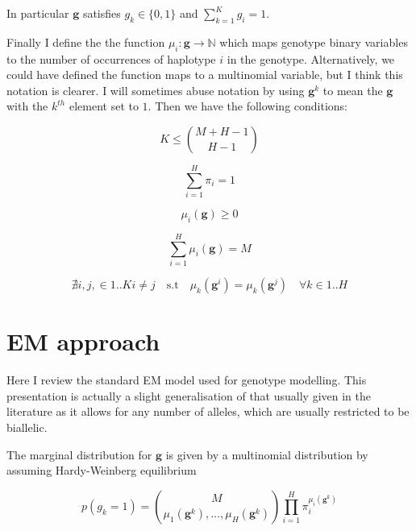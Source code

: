 \documentclass{article}
\begin{document}
In particular $\boldsymbol{g}$ satisfies $g_k \in \{0, 1\}$ and $\sum_{k = 1}^{K} g_i = 1$.

Finally I define the the function $\mu_i : \boldsymbol{g} \rightarrow \mathbb{N}$ which maps genotype binary variables to the number of occurrences of haplotype $i$ in the genotype. Alternatively, we could have defined the function maps to a multinomial variable, but I think this notation is clearer. I will sometimes abuse notation by using $\boldsymbol{g}^k$ to mean the $\boldsymbol{g}$ with the $k^{th}$ element set to $1$. Then we have the following conditions:

\begin{equation} 
    K \le \binom{M + H - 1}{H - 1}
\end{equation}

\begin{equation} 
    \sum_{i = 1}^{H} \pi_i = 1
\end{equation}

\begin{equation} 
    \mu_i(\boldsymbol{g}) \ge 0
\end{equation}

\begin{equation} 
    \sum_{i = 1}^{H} \mu_i(\boldsymbol{g}) = M
\end{equation}

\begin{equation} 
    \nexists i,j,\in {1..K} i \ne j \quad \text{s.t} \quad \mu_k(\boldsymbol{g}^i) = \mu_k(\boldsymbol{g}^j) \quad \forall k \in {1..H}
\end{equation}

\section{EM approach}

Here I review the standard EM model used for genotype modelling. This presentation is actually a slight generalisation of that usually given in the literature as it allows for any number of alleles, which are usually restricted to be biallelic.

The marginal distribution for $\boldsymbol{g}$ is given by a multinomial distribution by assuming Hardy-Weinberg equilibrium

\begin{equation} 
    p(g_k = 1) = \binom{M}{\mu_1(\boldsymbol{g}^k),\dots,\mu_H(\boldsymbol{g}^k)} \prod_{i = 1}^H \pi_i^{\mu_i(\boldsymbol{g}^k)}
\end{equation}
\end{document}
